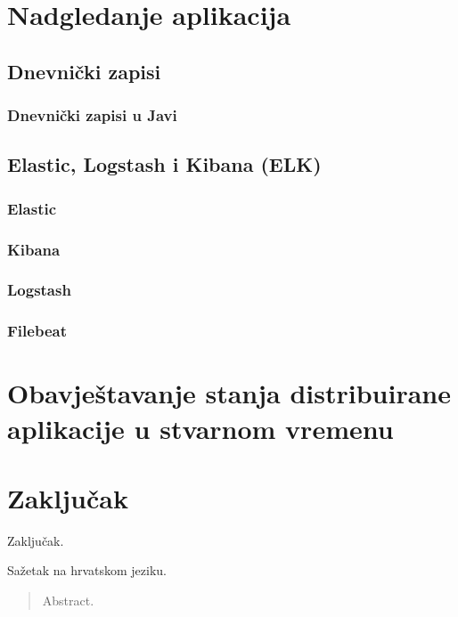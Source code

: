 \documentclass[times, utf8, diplomski]{fer}
\begin{document}
\chapter{Nadgledanje aplikacija}

\section{Dnevnički zapisi}
\label{sec:logs}
\subsection{Dnevnički zapisi u Javi}

\section{Elastic, Logstash i Kibana (ELK)}

\subsection{Elastic}

\subsection{Kibana}

\subsection{Logstash}

\subsection{Filebeat}

\chapter{Obavještavanje stanja distribuirane aplikacije u stvarnom vremenu}
\label{sec:realTimeMonitoring}

\chapter{Zaključak}
Zaključak.




\begin{sazetak}
Sažetak na hrvatskom jeziku.

\end{sazetak}

\begin{abstract}
Abstract.

\end{abstract} 
\end{document}
